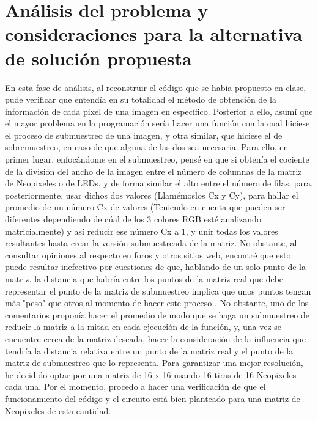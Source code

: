 \documentclass{article}
\begin{document}
 \section{Análisis del problema y consideraciones para la alternativa de solución propuesta}
 En esta fase de análisis, al reconstruir el código que se había propuesto en clase, pude verificar que entendía en su totalidad el método de obtención de la información de cada pixel de una imagen en específico. Posterior a ello, asumí que el mayor problema en la programación sería hacer una función con la cual hiciese el proceso de submuestreo de una imagen, y otra similar, que hiciese el de sobremuestreo, en caso de que alguna de las dos sea necesaria. Para ello, en primer lugar, enfocándome en el submuestreo, pensé en que si obtenía el cociente de la división del ancho de la imagen entre el número de columnas de la matriz de Neopixeles o de LEDs, y de forma similar el alto entre el número de filas, para, posteriormente, usar dichos dos valores (Llamémoslos Cx y Cy), para hallar el promedio de un número Cx de valores (Teniendo en cuenta que pueden ser diferentes dependiendo de cúal de los 3 colores RGB esté analizando matricialmente) y así reducir ese número Cx a 1, y unir todas los valores resultantes hasta crear la versión submuestreada de la matriz. No obstante, al consultar opiniones al respecto en foros y otros sitios web, encontré que esto puede resultar inefectivo por cuestiones de que, hablando de un solo punto de la matriz, la distancia que habría entre los puntos de la matriz real que debe representar el punto de la matriz de submuestreo implica que unos puntos tengan más "peso" que otros al momento de hacer este proceso \cite{AplicarRemuestreo}. No obstante, uno de los comentarios \cite{Comm_ReduImg} proponía hacer el promedio de modo que se haga un submuestreo de reducir la matriz a la mitad en cada ejecución de la función, y, una vez se encuentre cerca de la matriz deseada, hacer la consideración de la influencia que tendría la distancia relativa entre un punto de la matriz real y el punto de la matriz de submuestreo que lo representa. Para garantizar una mejor resolución, he decidido optar por una matriz de 16 x 16 usando 16 tiras de 16 Neopixeles cada una. Por el momento, procedo a hacer una verificación de que el funcionamiento del código y el circuito está bien planteado para una matriz de Neopixeles de esta cantidad.
\end{document}
